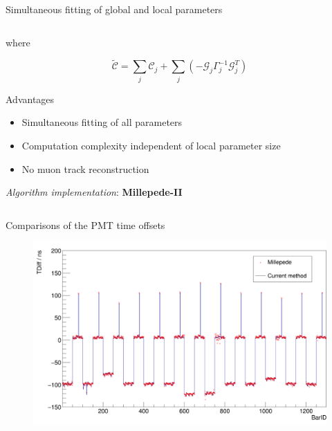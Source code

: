 \documentclass[compress, 13pt, aspectratio=169]{beamer}
\begin{document}
\begin{frame}[t,fragile]{Simultaneous fitting of global and local parameters}
\begin{columns}[t]
\begin{column}[t]{0.45\textwidth}
{				where
				\vspace*{-1em}

				$$\tilde{\mathcal{C}} = \sum_j \mathcal{C}_j + \sum_j \left(-\mathcal{G}_j \Gamma^{-1}_j \mathcal{G}^T_j \right)$$
			}
			\vspace*{-1em}

			\pause
			\begin{exampleblock} {Advantages}
				\small
				\begin{itemize}
					\item Simultaneous fitting of all parameters
					\item Computation complexity independent of local parameter size
					\item No muon track reconstruction
				\end{itemize}
			\end{exampleblock}
			\pause
			\textit{\small Algorithm implementation}: \large{\textbf{Millepede-II}}\footnotemark
		\end{column}
	\end{columns}

\end{frame}

\begin{frame}[t]{Comparisons of the PMT time offsets}
	\begin{figure}[t]
		\vspace*{-1em}
		\centering
		\includegraphics[height = 0.9 \textheight]{t_diff.png}
	\end{figure}
\end{frame}
\end{document}
